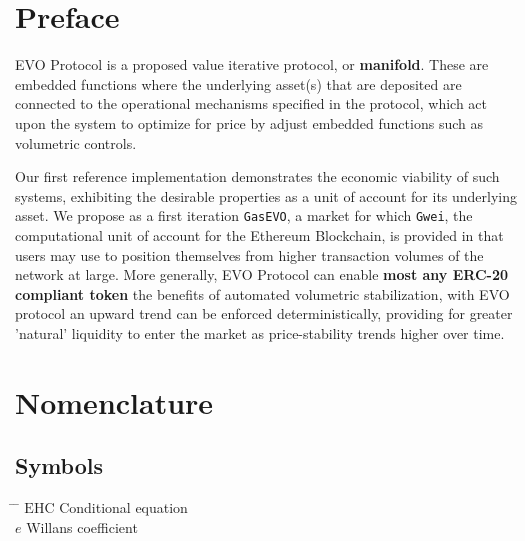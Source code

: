 
\chapter*{Preface}

EVO Protocol is a proposed value iterative protocol, or \textbf{manifold}.
These are embedded functions where the underlying asset(s) that are deposited are connected to the operational mechanisms specified in the protocol, which act upon the system to optimize for price by adjust embedded functions such as volumetric controls.\\
\vspace{2mm}
    
Our first reference implementation demonstrates the economic viability of such systems, exhibiting the desirable properties as a unit of account for its underlying asset.
We propose as a first iteration \texttt{GasEVO}, a market for  which \texttt{Gwei}, the computational unit of account for the Ethereum Blockchain, is provided in that users may use to position themselves from higher transaction volumes of the network at large.
\vspace{2mm}
More generally, EVO Protocol can enable \textbf{most any ERC-20 compliant token} the benefits of automated volumetric stabilization, with EVO protocol an upward trend can be enforced deterministically, providing for greater 'natural' liquidity to enter the market as price-stability trends higher over time. 


\cleardoublepage


\setcounter{tocdepth}{2}
\tableofcontents

\cleardoublepage



\chapter*{Nomenclature}\label{chap:symbole}

\section*{Symbols}
\begin{tabbing}
	\hspace*{1.6cm} \= \hspace*{8cm} \= \kill
	$\mathrm{EHC}$ \> Conditional equation \> [$-$] \\[0.5ex]
		$e$ \> Willans coefficient \> [$-$] \\
		\end{tabbing}
		

